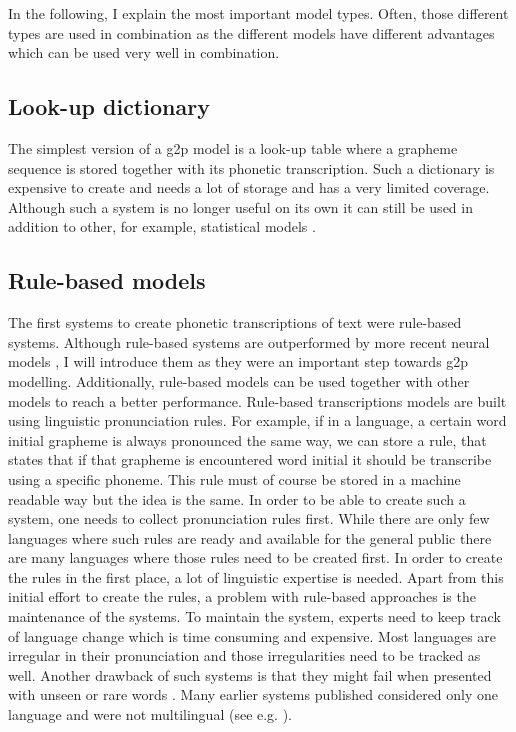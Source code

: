 In the following, I explain the most important model types. Often, those different types are used in combination as the different models have different advantages which can be used very well in combination. 

\subsection{Look-up dictionary} The simplest version of a \ac{g2p} model is a look-up table where a grapheme sequence is stored together with its phonetic transcription. Such a dictionary is expensive to create and needs a lot of storage and has a very limited coverage. Although such a system is no longer useful on its own it can still be used in addition to other, for example, statistical models \citep{ney-joint-sequence2008}.

\subsection{Rule-based models}
The first systems to create phonetic transcriptions of text were rule-based systems. Although rule-based systems are outperformed by more recent neural models \citep{Ashby-Bartley.2021, gorman-etal-2020-sigmorphon}, I will introduce them as they were an important step towards \ac{g2p} modelling. Additionally, rule-based models can be used together with other models to reach a better performance. Rule-based transcriptions models are built using linguistic pronunciation rules. For example, if in a language, a certain word initial grapheme is always pronounced the same way, we can store a rule, that states that if that grapheme is encountered word initial it should be transcribe using a specific phoneme. This rule must of course be stored in a machine readable way but the idea is the same. In order to be able to create such a system, one needs to collect pronunciation rules first. While there are only few languages where such rules are ready and available for the general public there are many languages where those rules need to be created first. In order to create the rules in the first place, a lot of linguistic expertise is needed. Apart from this initial effort to create the rules, a problem with rule-based approaches is the maintenance of the systems. To maintain the system, experts need to keep track of language change which is time consuming and expensive. Most languages are irregular in their pronunciation and those irregularities need to be tracked as well. Another drawback of such systems is that they might fail when presented with unseen or rare words \citep{ney-joint-sequence2008}. Many earlier systems published considered only one language and were not multilingual (see e.g. \citet{rule-based2009}). 

